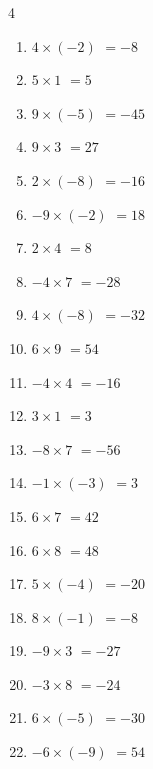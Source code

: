 \begin{multicols}{4}
\begin{enumerate}
  \item $4\times (-2)$
        $=-8$

  \item $5\times 1$
        $=5$

  \item $9\times (-5)$
        $=-45$

  \item $9\times 3$
        $=27$

  \item $2\times (-8)$
        $=-16$

  \item $-9\times (-2)$
        $=18$

  \item $2\times 4$
        $=8$

  \item $-4\times 7$
        $=-28$

  \item $4\times (-8)$
        $=-32$

  \item $6\times 9$
        $=54$

  \item $-4\times 4$
        $=-16$

  \item $3\times 1$
        $=3$

  \item $-8\times 7$
        $=-56$

  \item $-1\times (-3)$
        $=3$

\columnbreak %

\resetques

  \item $6\times 7$
        $=42$

  \item $6\times 8$
        $=48$

  \item $5\times (-4)$
        $=-20$

  \item $8\times (-1)$
        $=-8$

  \item $-9\times 3$
        $=-27$

  \item $-3\times 8$
        $=-24$

  \item $6\times (-5)$
        $=-30$

  \item $-6\times (-9)$
        $=54$


\end{enumerate}
\end{multicols}
